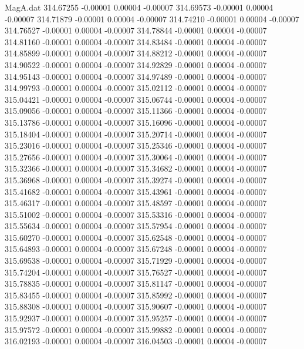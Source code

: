 \begin{filecontents}{MagA.dat}
 314.67255   -0.00001    0.00004   -0.00007
 314.69573   -0.00001    0.00004   -0.00007
 314.71879   -0.00001    0.00004   -0.00007
 314.74210   -0.00001    0.00004   -0.00007
 314.76527   -0.00001    0.00004   -0.00007
 314.78844   -0.00001    0.00004   -0.00007
 314.81160   -0.00001    0.00004   -0.00007
 314.83484   -0.00001    0.00004   -0.00007
 314.85899   -0.00001    0.00004   -0.00007
 314.88212   -0.00001    0.00004   -0.00007
 314.90522   -0.00001    0.00004   -0.00007
 314.92829   -0.00001    0.00004   -0.00007
 314.95143   -0.00001    0.00004   -0.00007
 314.97489   -0.00001    0.00004   -0.00007
 314.99793   -0.00001    0.00004   -0.00007
 315.02112   -0.00001    0.00004   -0.00007
 315.04421   -0.00001    0.00004   -0.00007
 315.06744   -0.00001    0.00004   -0.00007
 315.09056   -0.00001    0.00004   -0.00007
 315.11366   -0.00001    0.00004   -0.00007
 315.13786   -0.00001    0.00004   -0.00007
 315.16096   -0.00001    0.00004   -0.00007
 315.18404   -0.00001    0.00004   -0.00007
 315.20714   -0.00001    0.00004   -0.00007
 315.23016   -0.00001    0.00004   -0.00007
 315.25346   -0.00001    0.00004   -0.00007
 315.27656   -0.00001    0.00004   -0.00007
 315.30064   -0.00001    0.00004   -0.00007
 315.32366   -0.00001    0.00004   -0.00007
 315.34682   -0.00001    0.00004   -0.00007
 315.36968   -0.00001    0.00004   -0.00007
 315.39274   -0.00001    0.00004   -0.00007
 315.41682   -0.00001    0.00004   -0.00007
 315.43961   -0.00001    0.00004   -0.00007
 315.46317   -0.00001    0.00004   -0.00007
 315.48597   -0.00001    0.00004   -0.00007
 315.51002   -0.00001    0.00004   -0.00007
 315.53316   -0.00001    0.00004   -0.00007
 315.55634   -0.00001    0.00004   -0.00007
 315.57954   -0.00001    0.00004   -0.00007
 315.60270   -0.00001    0.00004   -0.00007
 315.62548   -0.00001    0.00004   -0.00007
 315.64893   -0.00001    0.00004   -0.00007
 315.67248   -0.00001    0.00004   -0.00007
 315.69538   -0.00001    0.00004   -0.00007
 315.71929   -0.00001    0.00004   -0.00007
 315.74204   -0.00001    0.00004   -0.00007
 315.76527   -0.00001    0.00004   -0.00007
 315.78835   -0.00001    0.00004   -0.00007
 315.81147   -0.00001    0.00004   -0.00007
 315.83455   -0.00001    0.00004   -0.00007
 315.85992   -0.00001    0.00004   -0.00007
 315.88308   -0.00001    0.00004   -0.00007
 315.90607   -0.00001    0.00004   -0.00007
 315.92937   -0.00001    0.00004   -0.00007
 315.95257   -0.00001    0.00004   -0.00007
 315.97572   -0.00001    0.00004   -0.00007
 315.99882   -0.00001    0.00004   -0.00007
 316.02193   -0.00001    0.00004   -0.00007
 316.04503   -0.00001    0.00004   -0.00007

\end{filecontents}
